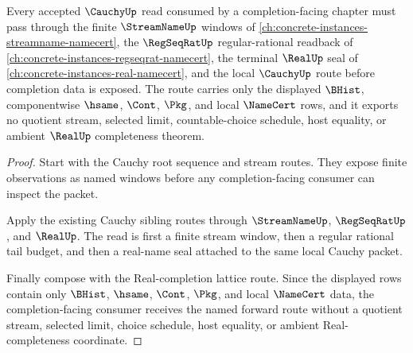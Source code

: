 \begin{theorem}
\label{thm:cauchy-orphan-forward-completion-route}
Every accepted $\CauchyUp$ read consumed by a completion-facing chapter must pass through the finite $\StreamNameUp$ windows of \autoref{ch:concrete-instances-streamname-namecert}, the $\RegSeqRatUp$ regular-rational readback of \autoref{ch:concrete-instances-regseqrat-namecert}, the terminal $\RealUp$ seal of \autoref{ch:concrete-instances-real-namecert}, and the local $\CauchyUp$ route before completion data is exposed. The route carries only the displayed $\BHist$, componentwise $\hsame$, $\Cont$, $\Pkg$, and local $\NameCert$ rows, and it exports no quotient stream, selected limit, countable-choice schedule, host equality, or ambient $\RealUp$ completeness theorem.
\end{theorem}
\begin{proof}
Start with the Cauchy root sequence and stream routes. They expose finite observations as named windows before any completion-facing consumer can inspect the packet.

Apply the existing Cauchy sibling routes through $\StreamNameUp$, $\RegSeqRatUp$, and $\RealUp$. The read is first a finite stream window, then a regular rational tail budget, and then a real-name seal attached to the same local Cauchy packet.

Finally compose with the Real-completion lattice route. Since the displayed rows contain only $\BHist$, $\hsame$, $\Cont$, $\Pkg$, and local $\NameCert$ data, the completion-facing consumer receives the named forward route without a quotient stream, selected limit, choice schedule, host equality, or ambient Real-completeness coordinate.
\end{proof}
